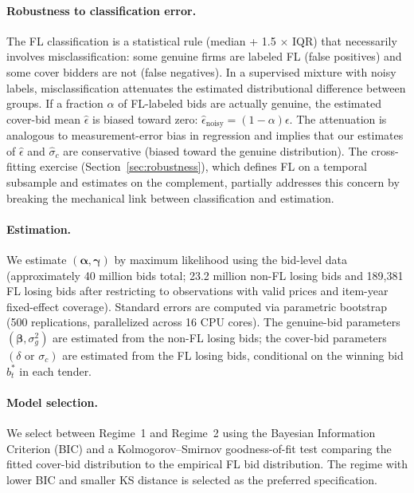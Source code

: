 \paragraph{Robustness to classification error.} %
The FL classification is a statistical rule (median + 1.5 $\times$ IQR)
that necessarily involves misclassification: some genuine firms are
labeled FL (false positives) and some cover bidders are not (false
negatives). In a supervised mixture with noisy labels, misclassification
attenuates the estimated distributional difference between groups. If
a fraction $\alpha$ of FL-labeled bids are actually genuine, the
estimated cover-bid mean $\hat{\epsilon}$ is biased toward zero:
$\hat{\epsilon}_{\text{noisy}} = (1-\alpha) \epsilon$. The attenuation
is analogous to measurement-error bias in regression and implies that
our estimates of $\hat{\epsilon}$ and $\hat{\sigma}_c$ are conservative
(biased toward the genuine distribution). The cross-fitting exercise
(Section~\ref{sec:robustness}), which defines FL on a temporal subsample
and estimates on the complement, partially addresses this concern by
breaking the mechanical link between classification and estimation.

\paragraph{Estimation.} We estimate $(\boldsymbol{\alpha},
\boldsymbol{\gamma})$ by maximum likelihood using the bid-level data
(approximately 40 million bids total; 23.2 million non-FL losing bids
and 189,381 FL losing bids after restricting to observations with valid
prices and item-year fixed-effect coverage). Standard errors are
computed via parametric bootstrap (500 replications, parallelized
across 16 CPU cores). The genuine-bid parameters
$(\boldsymbol{\beta}, \sigma_g^2)$ are estimated from the non-FL
losing bids; the cover-bid parameters
$(\delta \text{ or } \sigma_c)$ are estimated from the FL losing
bids, conditional on the winning bid $b^*_t$ in each tender.

\paragraph{Model selection.} We select between Regime~1 and Regime~2
using the Bayesian Information Criterion (BIC) and a Kolmogorov--Smirnov
goodness-of-fit test comparing the fitted cover-bid distribution to the
empirical FL bid distribution. The regime with lower BIC and smaller KS
distance is selected as the preferred specification.

